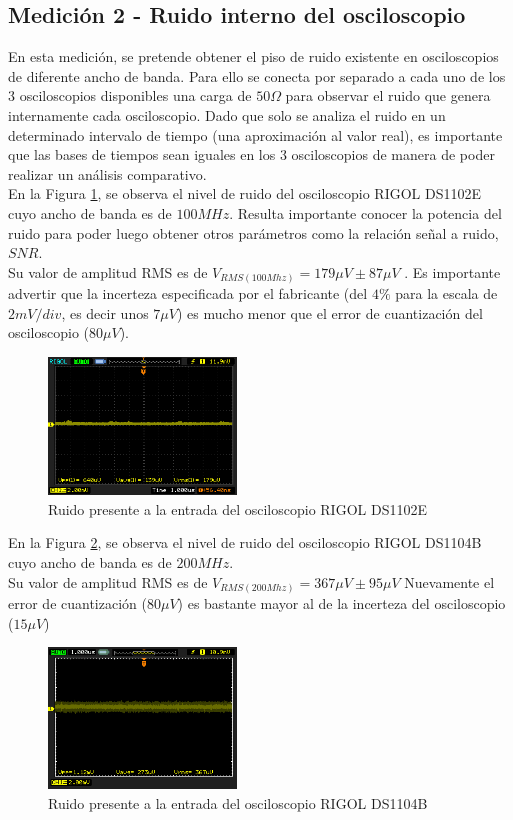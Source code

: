 \documentclass[a4paper,10pt]{article}
\begin{document}
	\subsection{Medición 2 - Ruido interno del osciloscopio}
	\indent En esta medici\'on, se pretende obtener el piso de ruido existente 
	en osciloscopios de diferente ancho de banda. Para ello se conecta por 
	separado a cada uno de los 3 osciloscopios disponibles una carga de 
	$50\Omega$ para observar el ruido que genera internamente cada osciloscopio.
	Dado que solo se analiza el ruido en un determinado intervalo de tiempo (una
	aproximaci\'on al valor real), es importante que las bases de tiempos sean 
	iguales en los 3 osciloscopios de manera de poder realizar un an\'alisis 
	comparativo. \\
	\indent En la Figura \ref{img005}, se observa el nivel de ruido del 
	osciloscopio RIGOL DS1102E cuyo ancho de banda es de $100MHz$. Resulta 
	importante conocer la potencia del ruido para poder luego obtener otros 
	par\'ametros como la relaci\'on se\~nal a ruido, $SNR$.\\
	\indent Su valor de amplitud RMS es de $V_{RMS(100Mhz)}=179\mu V \pm87\mu V$
	. Es importante advertir que la incerteza especificada por el fabricante 
	(del $4\%$ para la escala de $2mV/div$, es decir unos $7\mu V$) es mucho 
	menor que el error de cuantizaci\'on del osciloscopio ($80\mu V$).
		\begin{figure}[!htb]
			\centering
			\includegraphics[width=5cm]
			{Imagenes/Ruido100Mhz.png}
			\caption{Ruido presente a la entrada del osciloscopio RIGOL DS1102E}
			\label{img005}
		\end{figure}
		
	\indent En la Figura \ref{img006}, se observa el nivel de ruido del 
	osciloscopio RIGOL DS1104B cuyo ancho de banda es de $200MHz$. \\
	\indent Su valor de amplitud RMS es de $V_{RMS(200Mhz)}=367\mu V \pm95\mu V$
	Nuevamente el error de cuantizaci\'on ($80\mu V$) es bastante mayor al de la
	incerteza del osciloscopio ($15\mu V$)
		\begin{figure}[!htb]
			\centering
			\includegraphics[width=5cm]
			{Imagenes/Ruido200Mhz.png}
			\caption{Ruido presente a la entrada del osciloscopio RIGOL DS1104B}
			\label{img006}
		\end{figure}
		
\end{document}
